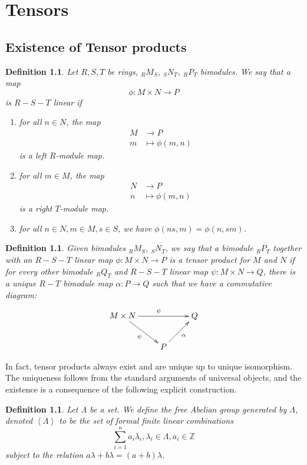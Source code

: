 \documentclass[12pt]{report}
\theoremstyle{plain}
\newtheorem{defn}[thm]{Definition}
\newcommand{\ZZ}{\mathbb{Z}}
\begin{document}
\fi

\appendix

\chapter{Tensors}


\section{Existence of Tensor products}

\begin{defn}
Let $R, S, T$ be rings, $_R M_S$, $_S N_T$, $_R P _T$ bimodules. We say
that a map
\[\phi : M \times N \to P\]
is $R-S-T$ linear if
\begin{enumerate}[1. ]
\item for all $n \in N$, the map
\begin{align*}
M &\to P \\
m &\mapsto \phi(m, n)
\end{align*}
is a left $R$-module map.
\item for all $m \in M$, the map
\begin{align*}
N &\to P \\
n &\mapsto \phi(m, n)
\end{align*}
is a right $T$-module map.
\item for all $n \in N, m \in M, s \in S$, we have $\phi(ns, m) = \phi(n,
sm)$.
\end{enumerate}
\end{defn}

\begin{defn}
Given bimodules $ _R M_S$, $_S N_T$, we say that a bimodule $ _R P_T$
together with an $R-S-T$ linear map $\phi: M \times N \to P$ is a tensor product
for $M$ and $N$ if for every other bimodule $_R Q_T$ and $R-S-T$ linear map
$\psi : M \times N \to Q$, there is a unique $R-T$ bimodule map $\alpha : P
\to Q$ such that we have a commutative diagram:
\[\xymatrix{
M \times N \ar[rd]_{\psi} \ar[rr]^\psi & & Q \\
 & P \ar[ru]_{\alpha}
}\]
\end{defn}

In fact, tensor products always exist and are unique up to unique
isomorphism. The uniqueness follows from the standard arguments of
universal objects, and the existence is a consequence of the following
explicit construction.

\begin{defn}
Let $\Lambda$ be a set. We define the free Abelian group
generated by $\Lambda$, denoted $\left<\Lambda\right>$ to be the set
of formal finite linear combinations
\[\sum_{i = 1}^n a_i \lambda_i , \lambda_i \in
\Lambda, a_i \in \ZZ \]
subject to the relation $a \lambda + b \lambda = (a + b) \lambda$.
\end{defn}
\end{document}
